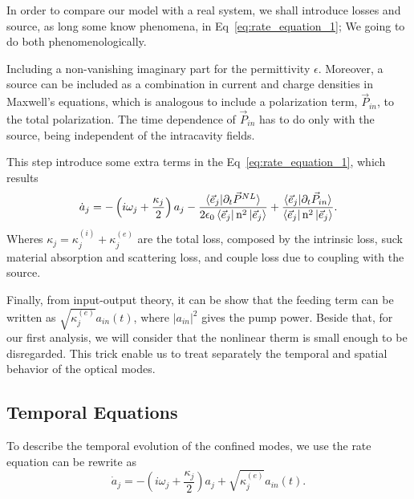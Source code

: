 In order to compare our model with a real system, we shall introduce losses and source, as long some know phenomena, in Eq~\ref{eq:rate_equation_1}; We going to do both phenomenologically.

Including a non-vanishing imaginary part for the permittivity $\epsilon$. Moreover, a source can be included as a combination in current and charge densities in Maxwell's equations, which is analogous to include a polarization term, $\vec{P}_{in}$, to the total polarization. The time dependence of $\vec{P}_{in}$ has to do only with the source, being independent of the intracavity fields.

This step introduce some extra terms in the Eq~\ref{eq:rate_equation_1}, which results
\begin{equation}
    \dot{a}_j = -\left(i\omega_j +\frac{\kappa_j}{2}\right)a_j -\frac{\braket{\vec{e}_j|\partial_t\vec{P}^{NL}}}{2\epsilon_0\bra{\vec{e}_j}\text{n}^2\ket{\vec{e}_j}}+\frac{\braket{\vec{e}_j|\partial_t\vec{P}_{in}}}{\bra{\vec{e}_j}\text{n}^2\ket{\vec{e}_j}}.
\end{equation}
Wheres $\kappa_j = \kappa^{(i)}_j+\kappa^{(e)}_j$ are the total loss, composed by the intrinsic loss, suck material absorption and scattering loss, and couple loss due to coupling with the source. 

Finally, from input-output theory, it can be show that the feeding term can be written as $\sqrt{\kappa^{(e)}_j}a_{in}(t)$, where $|a_{in}|^2$ gives the pump power. Beside that, for our first analysis, we will consider that the nonlinear therm is small enough to be disregarded. This trick enable us to treat separately the temporal and spatial behavior of the optical modes. 

\subsection{Temporal Equations}

To describe the temporal evolution of the confined modes, we use the rate equation can be rewrite as 
\begin{equation}
    \dot{a}_j = -\left(i\omega_j +\frac{\kappa_j}{2}\right)a_j +\sqrt{\kappa^{(e)}_j}a_{in}(t).
    \label{eq:rate_equation2}
\end{equation} 

